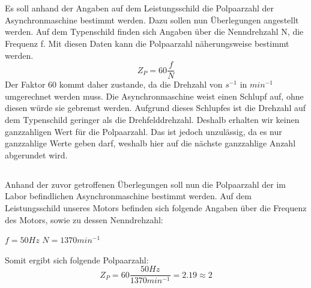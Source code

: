 \chapter{}
\section{}
Es soll anhand der Angaben auf dem Leistungsschild die Polpaarzahl der Asynchronmaschine bestimmt werden. Dazu sollen nun Überlegungen angestellt werden. Auf dem Typenschild finden sich Angaben über die Nenndrehzahl N, die Frequenz f. Mit diesen Daten kann die Polpaarzahl näherungsweise bestimmt werden.
\begin{equation}
	Z_{P} = 60\frac{f}{N}
\end{equation}
Der Faktor 60 kommt daher zustande, da die Drehzahl von $ s^{-1} $ in $ min^{-1} $ umgerechnet werden muss. Die Asynchronmaschine weist einen Schlupf auf, ohne diesen würde sie gebremst werden. Aufgrund dieses Schlupfes ist die Drehzahl auf dem Typenschild geringer als die Drehfelddrehzahl. Deshalb erhalten wir keinen ganzzahligen Wert für die  Polpaarzahl. Das ist jedoch unzulässig, da es nur ganzzahlige Werte geben darf, weshalb hier auf die nächste ganzzahlige Anzahl abgerundet wird.

\section{}
Anhand der zuvor getroffenen Überlegungen soll nun die Polpaarzahl der im Labor befindlichen Asynchronmaschine bestimmt werden. Auf dem Leistungsschild unseres Motors befinden sich folgende Angaben über die Frequenz des Motors, sowie zu dessen Nenndrehzahl:
\begin{center}
	$ f = 50Hz $ \hspace{2cm} $ N = 1370min^{-1} $
\end{center}
Somit ergibt sich folgende Polpaarzahl:
\begin{equation}
	Z_{P} = 60\frac{50Hz}{1370min^{-1}} = 2.19 \approx 2
\end{equation}


